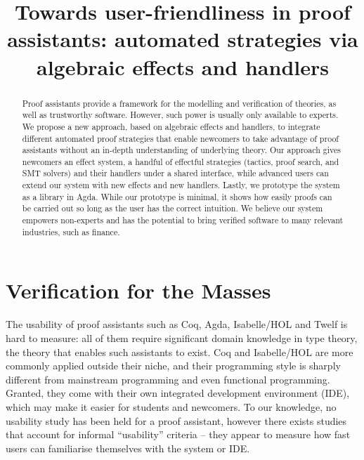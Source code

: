 \documentclass[sigconfl]{acmart}
\begin{document}
\title[Towards user-friendliness in proof assistants]{Towards user-friendliness
  in proof assistants: automated strategies \textbf{via} algebraic effects and handlers}



\begin{abstract}
Proof assistants provide a framework for the modelling and verification of
theories, as well as trustworthy software. However, such power is usually only
available to experts. We propose a new approach, based on algebraic effects and
handlers, to integrate different automated proof strategies that enable
newcomers to take advantage of proof assistants without an in-depth
understanding of underlying theory. Our approach gives newcomers an effect
system, a handful of effectful strategies (tactics, proof search, and SMT
solvers) and their handlers under a shared interface, while advanced users can
extend our system with new effects and new handlers. Lastly, we prototype the
system as a library in Agda. While our prototype is minimal, it shows how easily
proofs can be carried out so long as the user has the correct intuition. We
believe our system empowers non-experts and has the potential to bring verified
software to many relevant industries, such as finance.
\end{abstract}


\maketitle

\section{Verification for the Masses}

The usability of proof assistants such as Coq, Agda, Isabelle/HOL and Twelf is
hard to measure: all of them require significant domain knowledge in type
theory, the theory that enables such assistants to exist. Coq and Isabelle/HOL
are more commonly applied outside their niche, and their programming style is
sharply different from
mainstream programming and even functional programming. Granted, they come with
their own integrated development environment (IDE), which may make it easier for
students and newcomers. To our knowledge, no usability study has been
held for a proof assistant, however there exists studies that account for
informal ``usability'' criteria -- they appear to measure how fast users can
familiarise themselves with the system or IDE.
\end{document}
